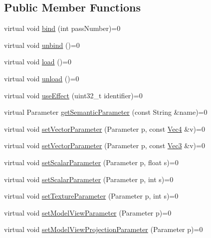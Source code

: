 \subsection*{\-Public \-Member \-Functions}
\begin{DoxyCompactItemize}
\item 
virtual void \hyperlink{class_verdi_1_1_uber_shader_aa39fec5a6c32f8493a8c9dc1146d7687}{bind} (int pass\-Number)=0
\item 
virtual void \hyperlink{class_verdi_1_1_uber_shader_a3f188c2079bdae35d5eb07f41f11272e}{unbind} ()=0
\item 
virtual void \hyperlink{class_verdi_1_1_uber_shader_a5b607971ae77e79792178a79546a262f}{load} ()=0
\item 
virtual void \hyperlink{class_verdi_1_1_uber_shader_a27fde535b204e6c55bdffb2baeead8f7}{unload} ()=0
\item 
virtual void \hyperlink{class_verdi_1_1_uber_shader_a70834be00678a9bb03ed7bf038d8a7c1}{use\-Effect} (uint32\-\_\-t identifier)=0
\item 
virtual \-Parameter \hyperlink{class_verdi_1_1_uber_shader_a386eee0f6894c403fe03aa166f215125}{get\-Semantic\-Parameter} (const \-String \&name)=0
\item 
virtual void \hyperlink{class_verdi_1_1_uber_shader_a9d769a929108812346b7859626ca4106}{set\-Vector\-Parameter} (\-Parameter p, const \hyperlink{class_verdi_1_1_vec4}{\-Vec4} \&v)=0
\item 
virtual void \hyperlink{class_verdi_1_1_uber_shader_aca9c0a6cfa866683063904e022c63365}{set\-Vector\-Parameter} (\-Parameter p, const \hyperlink{class_verdi_1_1_vec3}{\-Vec3} \&v)=0
\item 
virtual void \hyperlink{class_verdi_1_1_uber_shader_a294b7279b9f76df4f589433c453ae054}{set\-Scalar\-Parameter} (\-Parameter p, float s)=0
\item 
virtual void \hyperlink{class_verdi_1_1_uber_shader_ab3de9868736b87203cda53b5aff7699a}{set\-Scalar\-Parameter} (\-Parameter p, int s)=0
\item 
virtual void \hyperlink{class_verdi_1_1_uber_shader_a97ca53336545f11e1a6e5d04c94452fc}{set\-Texture\-Parameter} (\-Parameter p, int s)=0
\item 
virtual void \hyperlink{class_verdi_1_1_uber_shader_a741a7d751e9e69990581a307dc08418e}{set\-Model\-View\-Parameter} (\-Parameter p)=0
\item 
virtual void \hyperlink{class_verdi_1_1_uber_shader_aa4931fbc9df28049d84c0b85d5ec7a6b}{set\-Model\-View\-Projection\-Parameter} (\-Parameter p)=0
\end{DoxyCompactItemize}


